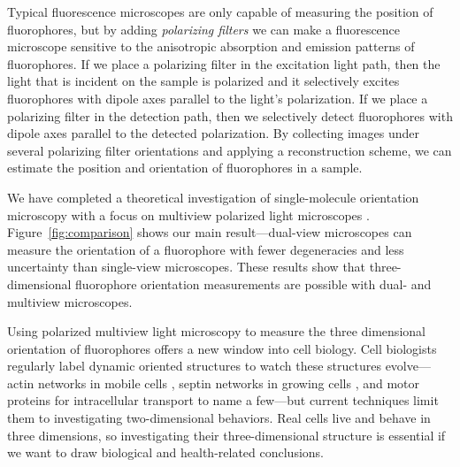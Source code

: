 \documentclass[11pt]{article}
\begin{document}
Typical fluorescence microscopes are only capable of measuring the position of
fluorophores, but by adding \textit{polarizing filters} we can make a
fluorescence microscope sensitive to the anisotropic absorption and emission
patterns of fluorophores. If we place a polarizing filter in the excitation
light path, then the light that is incident on the sample is polarized and it
selectively excites fluorophores with dipole axes parallel to the light's
polarization. If we place a polarizing filter in the detection path, then we
selectively detect fluorophores with dipole axes parallel to the detected
polarization. By collecting images under several polarizing filter orientations
and applying a reconstruction scheme, we can estimate the position and
orientation of fluorophores in a sample.

We have completed a theoretical investigation of single-molecule orientation
microscopy with a focus on multiview polarized light microscopes
\cite{chandler17}. Figure~\ref{fig:comparison} shows our main result---dual-view
microscopes can measure the orientation of a fluorophore with fewer degeneracies
and less uncertainty than single-view microscopes. These results show that
three-dimensional fluorophore orientation measurements are possible with dual-
and multiview microscopes.

Using polarized multiview light microscopy to measure the three dimensional
orientation of fluorophores offers a new window into cell biology. Cell
biologists regularly label dynamic oriented structures to watch these structures
evolve---actin networks in mobile cells \cite{mehta2016}, septin networks in
growing cells \cite{demay2011}, and motor proteins for intracellular transport
\cite{forkey2003} to name a few---but current techniques limit them to
investigating two-dimensional behaviors. Real cells live and behave in three
dimensions, so investigating their three-dimensional structure is essential if
we want to draw biological and health-related conclusions.
\end{document}
